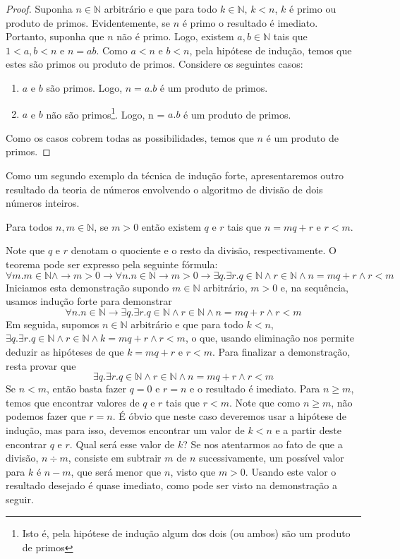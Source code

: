 \begin{proof}
Suponha $n\in\mathbb{N}$ arbitrário e que para todo $k \in
\mathbb{N},\,k < n$, $k$ é primo ou produto de primos. Evidentemente,
se $n$ é primo o resultado é imediato. Portanto, suponha que $n$ não é
primo. Logo, existem $a,b\in\mathbb{N}$ tais que $1 < a,b < n$ e $n =
ab$. Como $a < n$ e $b < n$, pela hipótese de indução, temos que estes
são primos ou produto de primos. Considere os seguintes casos:
\begin{enumerate}
  \item $a$ e $b$ são primos. Logo, $n = a.b$ é um produto de primos.
  \item $a$ e $b$ não são primos\footnote{Isto é, pela hipótese de
      indução algum dos dois (ou ambos) são um produto de
      primos}. Logo, n = $a.b$ é um produto de primos.
\end{enumerate}
Como os casos cobrem todas as possibilidades, temos que $n$ é um
produto de primos.
\end{proof}
Como um segundo exemplo da técnica de indução forte, apresentaremos
outro resultado da teoria de números envolvendo o algoritmo de
divisão de dois números inteiros.
\begin{Theorem}
Para todos $n,m\in\mathbb{N}$, se $m > 0$ então existem $q$ e
$r$ tais que $n = mq + r$ e $r < m$.
\end{Theorem}
Note que $q$ e $r$ denotam o quociente e o resto da divisão,
respectivamente. O teorema pode ser expresso pela seguinte fórmula:
\[
\forall m. m\in\mathbb{N} \land \to m > 0\to \forall n. n \in\mathbb{N} \to m > 0
\to \exists q. \exists r. q \in\mathbb{N}\land r \in \mathbb{N} \land
n = m q + r \land r < m
\]
Iniciamos esta demonstração supondo $m \in \mathbb{N}$ arbitrário, $m
> 0$ e, na sequência, usamos indução forte para demonstrar
\[
\forall n. n \in\mathbb{N}
\to \exists q. \exists r. q \in\mathbb{N}\land r \in \mathbb{N} \land
n = m q + r \land r < m
\]
Em seguida, supomos $n \in\mathbb{N}$ arbitrário e que para todo $k < n$,
$\exists q. \exists r. q \in\mathbb{N}\land r \in \mathbb{N} \land
k = m q + r \land r < m$, o que, usando eliminação nos permite deduzir
as hipóteses de que $k = m q + r$ e $r < m$. Para finalizar a
demonstração, resta provar que
\[
\exists q. \exists r. q \in\mathbb{N}\land r \in \mathbb{N} \land
n = m q + r \land r < m
\]
Se $n < m$, então basta fazer $q = 0$ e $r = n$ e o resultado é
imediato. Para $n \geq m$, temos que encontrar valores de $q$ e $r$
tais que $r < m$. Note que como $n \geq m$, não podemos fazer que $r =
n$. É óbvio que neste caso deveremos usar a hipótese de indução, mas
para isso, devemos encontrar um valor de $k< n$ e  a partir deste
encontrar $q$ e $r$. Qual será esse valor de $k$? Se nos atentarmos ao
fato de que a divisão, $n \div m$, consiste em subtrair $m$ de $n$
sucessivamente, um possível valor para $k$ é $n - m$, que será menor
que $n$, visto que $m > 0$. Usando este valor o resultado desejado é
quase imediato, como pode ser visto na demonstração a seguir.

